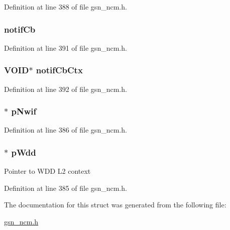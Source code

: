 Definition at line 388 of file gsn\_\-ncm.h.

\hypertarget{a00159_a8b4a72e6fff7893cb12d41268dcdbdf7}{
\subsubsection[{notifCb}]{ {\bf notifCb}}}
\label{a00159_a8b4a72e6fff7893cb12d41268dcdbdf7}


Definition at line 391 of file gsn\_\-ncm.h.

\hypertarget{a00159_a3b4dee05b0f332ef6668c044d86f1b28}{
\subsubsection[{notifCbCtx}]{\setlength{\rightskip}{0pt plus 5cm}VOID$\ast$ {\bf notifCbCtx}}}
\label{a00159_a3b4dee05b0f332ef6668c044d86f1b28}


Definition at line 392 of file gsn\_\-ncm.h.

\hypertarget{a00159_a98d510676ecd134a5e9ac61bf222cded}{
\subsubsection[{pNwif}]{$\ast$ {\bf pNwif}}}
\label{a00159_a98d510676ecd134a5e9ac61bf222cded}


Definition at line 386 of file gsn\_\-ncm.h.

\hypertarget{a00159_a97684b58b7a05f9b282a86a26929e1ba}{
\subsubsection[{pWdd}]{$\ast$ {\bf pWdd}}}
\label{a00159_a97684b58b7a05f9b282a86a26929e1ba}
Pointer to WDD L2 context 

Definition at line 385 of file gsn\_\-ncm.h.



The documentation for this struct was generated from the following file:\begin{DoxyCompactItemize}
\item 
\hyperlink{a00529}{gsn\_\-ncm.h}\end{DoxyCompactItemize}
